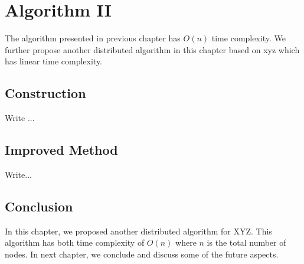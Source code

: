 \chapter{Algorithm II}

The algorithm presented in previous chapter has $O(n)$ time 
complexity. We further propose another
distributed algorithm in this chapter based on xyz which has linear time 
complexity.

\section{Construction}

Write ...

\section{Improved Method}

Write...

\section{Conclusion}
In this chapter, we proposed another distributed algorithm for
XYZ. This algorithm has both time complexity of $O(n)$ where $n$
is the total number of nodes.  In next chapter, we conclude and
discuss some of the future aspects.
